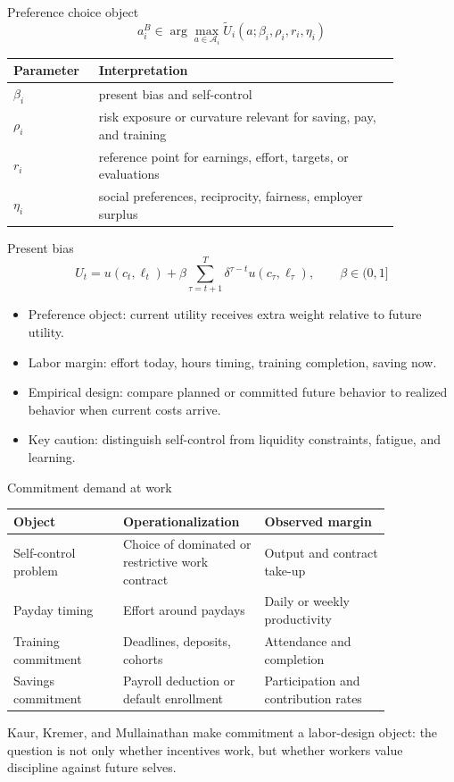 \documentclass[aspectratio=169,11pt]{beamer}
\begin{document}
\begin{frame}{Preference choice object}
\[
a_i^B \in \arg\max_{a \in \mathcal{A}_i}
\tilde{U}_i(a;\beta_i,\rho_i,r_i,\eta_i)
\]

\small
\begin{tabular}{p{0.16\linewidth} p{0.70\linewidth}}
\toprule
Parameter & Interpretation \\
\midrule
$\beta_i$ & present bias and self-control \\
$\rho_i$ & risk exposure or curvature relevant for saving, pay, and training \\
$r_i$ & reference point for earnings, effort, targets, or evaluations \\
$\eta_i$ & social preferences, reciprocity, fairness, employer surplus \\
\bottomrule
\end{tabular}
\end{frame}

\begin{frame}{Present bias}
\[
U_t = u(c_t,\ell_t) + \beta \sum_{\tau=t+1}^{T} \delta^{\tau-t}u(c_\tau,\ell_\tau),
\qquad \beta \in (0,1]
\]

\begin{itemize}
    \item Preference object: current utility receives extra weight relative to future utility.
    \item Labor margin: effort today, hours timing, training completion, saving now.
    \item Empirical design: compare planned or committed future behavior to realized behavior when current costs arrive.
    \item Key caution: distinguish self-control from liquidity constraints, fatigue, and learning.
\end{itemize}
\end{frame}

\begin{frame}{Commitment demand at work}
\small
\begin{tabular}{p{0.26\linewidth} p{0.28\linewidth} p{0.30\linewidth}}
\toprule
Object & Operationalization & Observed margin \\
\midrule
Self-control problem & Choice of dominated or restrictive work contract & Output and contract take-up \\
Payday timing & Effort around paydays & Daily or weekly productivity \\
Training commitment & Deadlines, deposits, cohorts & Attendance and completion \\
Savings commitment & Payroll deduction or default enrollment & Participation and contribution rates \\
\bottomrule
\end{tabular}

\vspace{0.6em}
Kaur, Kremer, and Mullainathan make commitment a labor-design object: the question is not only whether incentives work, but whether workers value discipline against future selves.
\end{frame}
\end{document}
